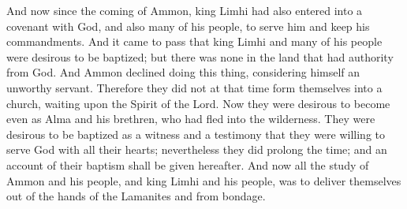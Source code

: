 And now since the coming of Ammon, king Limhi had also entered into a covenant with God, and also many of his people, to serve him and keep his commandments.
\bverse \iffalse And it came to pass that king Limhi and many of his people were desirous to be baptized; but there was none in the land that had authority from God. And Ammon declined doing this thing, considering himself an unworthy servant. \fi
And it came to pass that king Limhi and many of his people were desirous to be baptized; but there was none in the land that had authority from God. And Ammon declined doing this thing, considering himself an unworthy servant.
\bverse \iffalse Therefore they did not at that time form themselves into a church, waiting upon the Spirit of the Lord. Now they were desirous to become even as Alma and his brethren, who had fled into the wilderness. \fi
Therefore they did not at that time form themselves into a church, waiting upon the Spirit of the Lord. Now they were desirous to become even as Alma and his brethren, who had fled into the wilderness.
\bverse \iffalse They were desirous to be baptized as a witness and a testimony that they were willing to serve God with all their hearts; nevertheless they did prolong the time; and an account of their baptism shall be given hereafter. \fi
They were desirous to be baptized as a witness and a testimony that they were willing to serve God with all their hearts; nevertheless they did prolong the time; and an account of their baptism shall be given hereafter.
\bverse \iffalse And now all the study of Ammon and his people, and king Limhi and his people, was to deliver themselves out of the hands of the Lamanites and from bondage. \fi
And now all the study of Ammon and his people, and king Limhi and his people, was to deliver themselves out of the hands of the Lamanites and from bondage.

